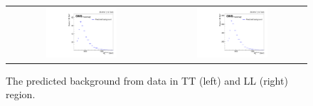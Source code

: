 \begin{figure}[t]
  \centering
 \begin{tabular}{cc}
    \includegraphics[width=0.5\textwidth]{Figures/al/mjj_TT.pdf} &
   \includegraphics[width=0.5\textwidth]{Figures/al/mjj_LL.pdf} 
   
  \end{tabular}
  \caption{The predicted background from data in TT (left) and LL (right) region.}
 \label{fig:45}
\end{figure}

\clearpage
